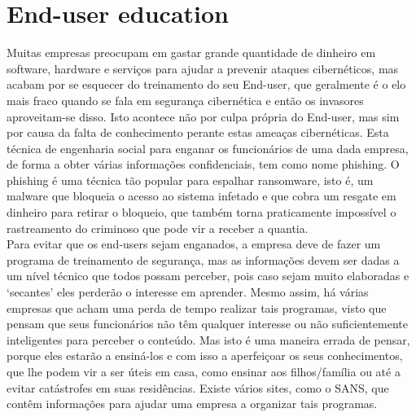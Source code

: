 \documentclass{report}
\begin{document}
\section{End-user education}
\cite{cyberdefensemagazine}
\normalsize{Muitas empresas preocupam em gastar grande quantidade de dinheiro em software, hardware e serviços para ajudar a prevenir ataques cibernéticos, mas acabam por se esquecer do treinamento do seu End-user, que geralmente é o elo mais fraco quando se fala em segurança cibernética e então os invasores aproveitam-se disso. Isto acontece não por culpa própria do End-user, mas sim por causa da falta de conhecimento perante estas ameaças cibernéticas. Esta técnica de engenharia social para enganar os funcionários de uma dada empresa, de forma a obter várias informações confidenciais, tem como nome phishing. O phishing é uma técnica tão popular para espalhar ransomware, isto é, um malware que bloqueia o acesso ao sistema infetado e que cobra um resgate em dinheiro para retirar o bloqueio, que também torna praticamente impossível o rastreamento do criminoso que pode vir a receber a quantia. \\

Para evitar que os end-users sejam enganados, a empresa deve de fazer um programa de treinamento de segurança, mas as informações devem ser dadas a um nível técnico que todos possam perceber, pois caso sejam muito elaboradas e ‘secantes’ eles perderão o interesse em aprender. Mesmo assim, há várias empresas que acham uma perda de tempo realizar tais programas, visto que pensam que seus funcionários não têm qualquer interesse ou não suficientemente inteligentes para perceber o conteúdo. Mas isto é uma maneira errada de pensar, porque eles estarão a ensiná-los e com isso a aperfeiçoar os seus conhecimentos, que lhe podem vir a ser úteis em casa, como ensinar aos filhos/família ou até a evitar catástrofes em suas residências. Existe vários sites, como o SANS, que contêm informações para ajudar uma empresa a organizar tais programas. \\

}
\end{document}
